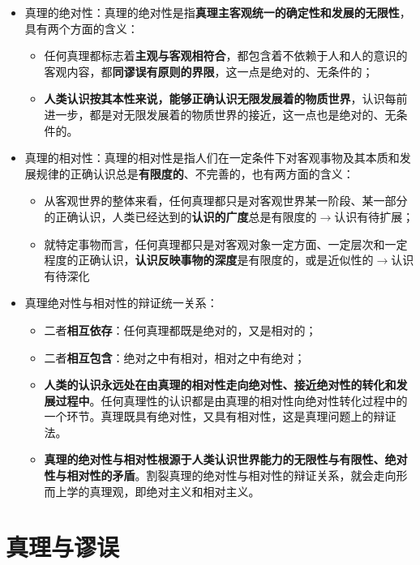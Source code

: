 \documentclass[
]{article}
\begin{document}
\begin{itemize}
\item
  真理的绝对性：真理的绝对性是指\textbf{真理主客观统一的确定性和发展的无限性}，具有两个方面的含义：

  \begin{itemize}
  \item
    任何真理都标志着\textbf{主观与客观相符合}，都包含着不依赖于人和人的意识的客观内容，都\textbf{同谬误有原则的界限}，这一点是绝对的、无条件的；
  \item
    \textbf{人类认识按其本性来说，能够正确认识无限发展着的物质世界}，认识每前进一步，都是对无限发展着的物质世界的接近，这一点也是绝对的、无条件的。
  \end{itemize}
\item
  真理的相对性：真理的相对性是指人们在一定条件下对客观事物及其本质和发展规律的正确认识总是\textbf{有限度的}、不完善的，也有两方面的含义：

  \begin{itemize}
  \item
    从客观世界的整体来看，任何真理都只是对客观世界某一阶段、某一部分的正确认识，人类已经达到的\textbf{认识的广度}总是有限度的\(\to\)认识有待扩展；
  \item
    就特定事物而言，任何真理都只是对客观对象一定方面、一定层次和一定程度的正确认识，\textbf{认识反映事物的深度}是有限度的，或是近似性的\(\to\)认识有待深化
  \end{itemize}
\item
  真理绝对性与相对性的辩证统一关系：

  \begin{itemize}
  \item
    二者\textbf{相互依存}：任何真理都既是绝对的，又是相对的；
  \item
    二者\textbf{相互包含}：绝对之中有相对，相对之中有绝对；
  \item
    \textbf{人类的认识永远处在由真理的相对性走向绝对性、接近绝对性的转化和发展过程中}。任何真理性的认识都是由真理的相对性向绝对性转化过程中的一个环节。真理既具有绝对性，又具有相对性，这是真理问题上的辩证法。
  \item
    \textbf{真理的绝对性与相对性根源于人类认识世界能力的无限性与有限性、绝对性与相对性的矛盾}。割裂真理的绝对性与相对性的辩证关系，就会走向形而上学的真理观，即绝对主义和相对主义。
  \end{itemize}
\end{itemize}

\hypertarget{ux771fux7406ux4e0eux8c2cux8bef}{%
\section{真理与谬误}\label{ux771fux7406ux4e0eux8c2cux8bef}}
\end{document}
